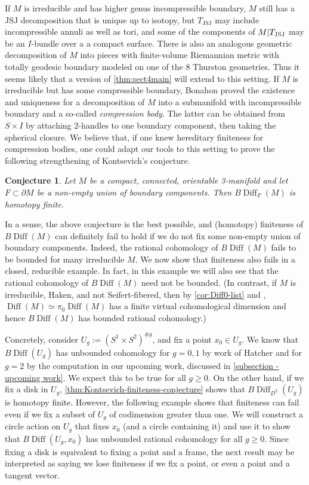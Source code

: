 \documentclass{amsart}
\theoremstyle{plain}
\newtheorem{conj}[thm]{Conjecture}
\theoremstyle{definition}
\DeclareMathOperator\Diff{Diff}
\DeclareMathOperator{\JSJ}{JSJ}
\newcommand{\ca}{\smash{\mid}} %
\newcommand{\BDiff}{B\!\Diff}
\begin{document}
If $M$ is irreducible and has higher genus incompressible boundary, $M$ still has a JSJ decomposition that is unique up to isotopy, but $T_{\JSJ}$ may include incompressible annuli as well as tori, and some of the components of $M\ca T_{\JSJ}$ may be an $I$-bundle over a a compact surface. There is also an analogous geometric decomposition of $M$ into pieces with finite-volume Riemannian metric with totally geodesic boundary modeled on one of the 8 Thurston geometries. Thus it seems likely that a version of \cref{thm:sect4main} will extend to this setting. If $M$ is irreducible but has some compressible boundary, Bonahon \cite{Bonahon1983} proved the existence and uniqueness for a decomposition of $M$ into a submanifold with incompressible boundary and a so-called \emph{compression body}. The latter can be obtained from $S\times I$ by attaching 2-handles to one boundary component, then taking the spherical closure. 
We believe that, if one knew hereditary finiteness for compression bodies, one could adapt our tools to this setting to prove the following strengthening of Kontsevich's conjecture.

\begin{conj}\label{conj:Strong-Kontsevich} Let $M$ be a compact, connected, orientable 3-manifold and let $F\subset \partial M$ be a non-empty union of boundary components. Then $\BDiff_F(M)$ is homotopy finite.
\end{conj}


In a sense, the above conjecture is the best possible, and (homotopy) finiteness of $\BDiff(M)$ can definitely fail to hold if we do not fix some non-empty union of boundary components.  Indeed, the rational cohomology of $\BDiff(M)$ fails to be bounded for many irreducible $M$. 
We now show that finiteness also fails in a closed, reducible example. 
In fact, in this example we will also see that the rational cohomology of $\BDiff(M)$ need not be bounded.
(In contrast, if $M$ is irreducible, Haken, and not Seifert-fibered,  then by \cref{cor:Diff0-list} and \cite{McCullough1991}, $\Diff(M) \simeq \pi_0\Diff(M)$ has a finite virtual cohomological dimension and hence $\BDiff(M)$ has bounded rational cohomology.)

Concretely, consider $U_g := (S^1 \times S^2)^{\#g}$, and fix a point $x_0 \in U_g$. We know that $\BDiff(U_g)$ has unbounded cohomology for $g=0,1$ by work of Hatcher \cite{Hatcher, Hatcher1981} and for $g=2$ by the computation in our upcoming work, discussed in \cref{subsection - upcoming work}.
We expect this to be true for all $g\ge0$. On the other hand, if we fix a disk in $U_g$,  \cref{thm:Kontsevich-finiteness-conjecture} shows that $\BDiff_{D^3}(U_g)$ is homotopy finite. However, the following example shows that finiteness can fail even if we fix a subset of $U_g$ of codimension greater than one. We will construct a circle action on $U_g$ that fixes $x_0$ (and a circle containing it) and use it to show that $\BDiff(U_g , x_0)$ has unbounded rational cohomology for all $g \ge 0$. Since fixing a disk is equivalent to fixing a point and a frame, the next result may be interpreted as saying we lose finiteness if we fix a point, or even a point and a tangent vector.  
\end{document}
